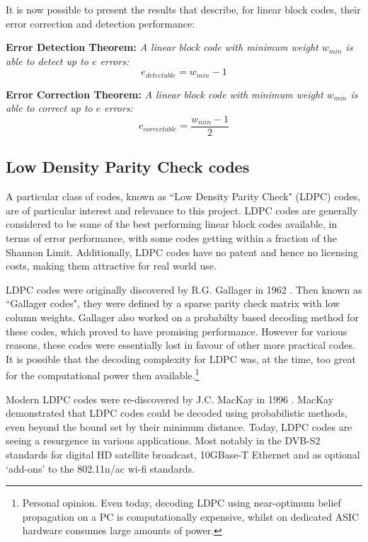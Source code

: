 \documentclass[11pt]{article}
\numberwithin{equation}{subsection}
\begin{document}
It is now possible to present the results that describe, for linear block codes, their error correction and detection performance:

\medskip
\noindent
\textbf{Error Detection Theorem:}
\textit{A linear block code with minimum weight $w_{min}$ is able to detect up to $e$ errors:}
\begin{equation}
e_{detectable} = w_{min} - 1
\end{equation}

\noindent
\textbf{Error Correction Theorem:}
\textit{A linear block code with minimum weight $w_{min}$ is able to correct up to $e$ errors:}
\begin{equation}
e_{correctable} = \dfrac{w_{min} - 1}{2}
\end{equation}

\subsection{Low Density Parity Check codes}
A particular class of codes, known as ``Low Density Parity Check" (LDPC) codes, are of particular interest and relevance to this project. LDPC codes are generally considered to be some of the best performing linear block codes available, in terms of error performance, with some codes getting within a fraction of the Shannon Limit. Additionally, LDPC codes have no patent and hence no licensing costs, making them attractive for real world use.

LDPC codes were originally discovered by R.G. Gallager in 1962 \cite{gallager1962low}. Then known as ``Gallager codes", they were defined by a sparse parity check matrix with low column weights. Gallager also worked on a probabilty based decoding method for these codes, which proved to have promising performance. However for various reasons, these codes were essentially lost in favour of other more practical codes. It is possible that the decoding complexity for LDPC was, at the time, too great for the computational power then available.\footnote{Personal opinion. Even today, decoding LDPC using near-optimum belief propagation on a PC is computationally expensive, whilst on dedicated ASIC hardware consumes large amounts of power.}

Modern LDPC codes were re-discovered by J.C. MacKay in 1996 \cite{mncisit}. MacKay demonstrated that LDPC codes could be decoded using probabilistic methods, even beyond the bound set by their minimum distance. Today, LDPC codes are seeing a resurgence in various applications. Most notably in the DVB-S2 standards for digital HD satellite broadcast, 10GBase-T Ethernet and as optional `add-ons' to the 802.11n/ac wi-fi standards.
\end{document}

